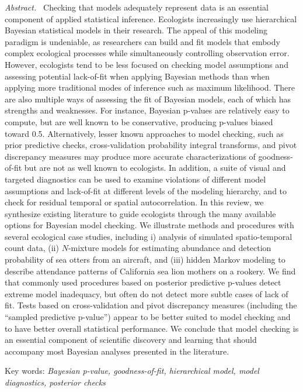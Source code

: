 \documentclass[12pt,english]{article}
\begin{document}
\begin{spacing}{1.9}
{\em Abstract.\ } Checking that models adequately represent data is an
essential component of applied statistical inference.  Ecologists
increasingly use hierarchical Bayesian statistical models in their
research.  The appeal of this modeling paradigm is undeniable, as
researchers can build and fit models that embody complex ecological
processes while simultaneously controlling observation error. However, ecologists tend to be less
focused on checking model assumptions and assessing potential
lack-of-fit when applying Bayesian methods than when applying
more traditional modes of inference such as maximum likelihood.  There
are also multiple ways of assessing the fit of Bayesian
models, each of which has strengths and weaknesses.  For instance, Bayesian p-values are relatively easy to compute, but are
well known to be conservative, producing p-values biased toward 0.5.
Alternatively, lesser known approaches to model checking, such as
prior predictive checks, cross-validation probability integral
transforms, and pivot discrepancy measures may produce more accurate
characterizations of goodness-of-fit but are not as well known to
ecologists.  In addition, a suite of visual and targeted diagnostics
can be used to examine violations of different model assumptions and
lack-of-fit at different levels of the modeling hierarchy, and to
check for residual temporal or spatial autocorrelation.  In this
review, we synthesize existing literature to guide ecologists
through the many available options for Bayesian model checking.  We
illustrate methods and procedures with several ecological case
studies, including i) analysis of simulated spatio-temporal count data, (ii) $N$-mixture
models for estimating abundance and detection probability of sea otters
from an aircraft, and (iii) hidden Markov modeling to describe attendance patterns of California sea lion mothers on a rookery.  We find that commonly used procedures based on posterior predictive p-values detect extreme model
inadequacy, but often do not detect more subtle cases of lack of fit.
Tests based on cross-validation and pivot discrepancy measures
(including the ``sampled predictive p-value'') appear to be
better suited to model checking and to have better overall statistical
performance. We conclude that model checking is an essential component
of scientific discovery and learning that should accompany most
Bayesian analyses presented in the literature.


{Key words: \em Bayesian p-value, goodness-of-fit,
  hierarchical model, model diagnostics, posterior checks}




\end{spacing}
\end{document}
